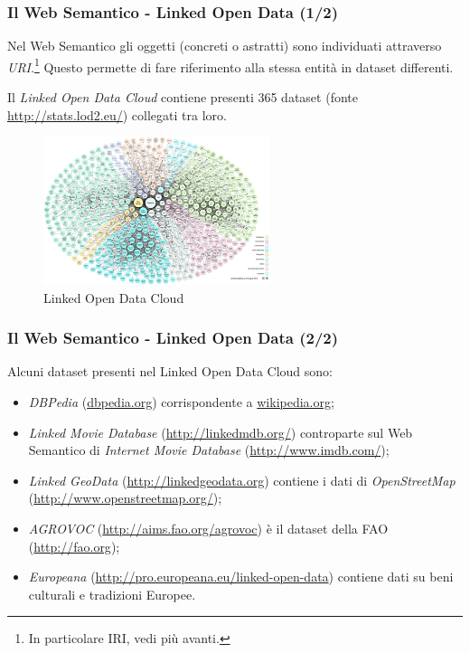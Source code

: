 \documentclass[8pt]{beamer}
\begin{document}
\begin{frame}
 \frametitle{Il Web Semantico - Linked Open Data (1/2)}
 
 Nel Web Semantico gli oggetti (concreti o astratti) sono individuati
 attraverso \emph{URI}.\footnote{In particolare IRI, vedi pi\`u avanti.}
 Questo permette di fare riferimento alla stessa entit\`a in dataset
 differenti.
 \vspace{\baselineskip}
 
 Il \emph{Linked Open Data Cloud} contiene presenti 365 dataset 
 (fonte \url{http://stats.lod2.eu/}) collegati tra loro.
\begin{figure}
    \includegraphics[width=250px]{lod-cloud_colored_1000px.png} 
    \caption{Linked Open Data Cloud}
\end{figure}
\end{frame}

\begin{frame}
 \frametitle{Il Web Semantico - Linked Open Data (2/2)}
 Alcuni dataset presenti nel Linked Open Data Cloud sono:
 
  \begin{itemize}
  \item \emph{DBPedia} (\url{dbpedia.org}) corrispondente a \url{wikipedia.org};
  \item \emph{Linked Movie Database} (\url{http://linkedmdb.org/}) controparte sul Web Semantico di \emph{Internet Movie Database} 
  (\url{http://www.imdb.com/});
  \item \emph{Linked GeoData} (\url{http://linkedgeodata.org}) 
    contiene i dati di \emph{OpenStreetMap} (\url{http://www.openstreetmap.org/});
    \item \emph{AGROVOC} (\url{http://aims.fao.org/agrovoc}) \`e il dataset della FAO (\url{http://fao.org});
    \item \emph{Europeana} (\url{http://pro.europeana.eu/linked-open-data}) contiene dati su beni culturali e tradizioni Europee. 
  \end{itemize}
\end{frame}
\end{document}
